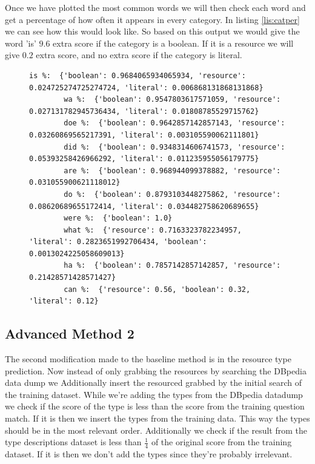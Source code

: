 \documentclass[sigconf]{acmart}
\begin{document}
Once we have plotted the most common words we will then check each word and get a percentage of how often it appears in every category. In listing \ref{lis:catper} we can see how this would look like. So based on this output we would give the word 'is' $9.6$ extra score if the category is a boolean. If it is a resource we will give $0.2$ extra score, and no extra score if the category is literal.

\begin{figure}[h]
    \begin{lstlisting}[caption=Checking the category percentage of words, label={lis:catper}]
        is %:  {'boolean': 0.9684065934065934, 'resource': 0.024725274725274724, 'literal': 0.006868131868131868}
        wa %:  {'boolean': 0.9547803617571059, 'resource': 0.027131782945736434, 'literal': 0.01808785529715762}
        doe %:  {'boolean': 0.9642857142857143, 'resource': 0.03260869565217391, 'literal': 0.003105590062111801}
        did %:  {'boolean': 0.9348314606741573, 'resource': 0.05393258426966292, 'literal': 0.011235955056179775}
        are %:  {'boolean': 0.968944099378882, 'resource': 0.031055900621118012}
        do %:  {'boolean': 0.8793103448275862, 'resource': 0.08620689655172414, 'literal': 0.034482758620689655}
        were %:  {'boolean': 1.0}
        what %:  {'resource': 0.7163323782234957, 'literal': 0.2823651992706434, 'boolean': 0.0013024225058609013}
        ha %:  {'boolean': 0.7857142857142857, 'resource': 0.21428571428571427}
        can %:  {'resource': 0.56, 'boolean': 0.32, 'literal': 0.12}
        \end{lstlisting}
\end{figure}



\subsection{Advanced Method 2}

The second modification made to the baseline method is in the resource type prediction. Now instead of only grabbing the resources by searching the DBpedia data dump we Additionally insert the resourced grabbed by the initial search of the training dataset. While we're adding the types from the DBpedia datadump we check if the score of the type is less than the score from the training question match. If it is then we insert the types from the training data. This way the types should be in the most relevant order. Additionally we check if the result from the type descriptions dataset is less than $\frac{1}{4}$ of the original score from the training dataset. If it is then we don't add the types since they're probably irrelevant. 
\end{document}
